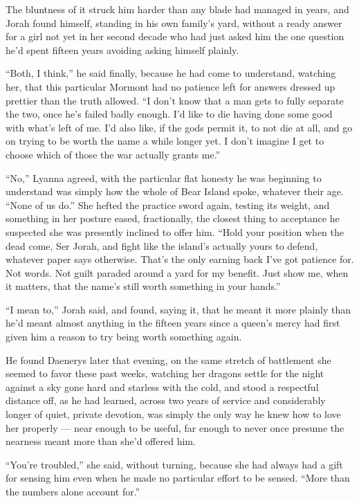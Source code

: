 The bluntness of it struck him harder than any blade had managed in years, and Jorah found himself, standing in his own family’s yard, without a ready answer for a girl not yet in her second decade who had just asked him the one question he’d spent fifteen years avoiding asking himself plainly.

“Both, I think,” he said finally, because he had come to understand, watching her, that this particular Mormont had no patience left for answers dressed up prettier than the truth allowed. “I don’t know that a man gets to fully separate the two, once he’s failed badly enough. I’d like to die having done some good with what’s left of me. I’d also like, if the gods permit it, to not die at all, and go on trying to be worth the name a while longer yet. I don’t imagine I get to choose which of those the war actually grants me.”

“No,” Lyanna agreed, with the particular flat honesty he was beginning to understand was simply how the whole of Bear Island spoke, whatever their age. “None of us do.” She hefted the practice sword again, testing its weight, and something in her posture eased, fractionally, the closest thing to acceptance he suspected she was presently inclined to offer him. “Hold your position when the dead come, Ser Jorah, and fight like the island’s actually yours to defend, whatever paper says otherwise. That’s the only earning back I’ve got patience for. Not words. Not guilt paraded around a yard for my benefit. Just show me, when it matters, that the name’s still worth something in your hands.”

“I mean to,” Jorah said, and found, saying it, that he meant it more plainly than he’d meant almost anything in the fifteen years since a queen’s mercy had first given him a reason to try being worth something again.

\sceneBreak

He found Daenerys later that evening, on the same stretch of battlement she seemed to favor these past weeks, watching her dragons settle for the night against a sky gone hard and starless with the cold, and stood a respectful distance off, as he had learned, across two years of service and considerably longer of quiet, private devotion, was simply the only way he knew how to love her properly — near enough to be useful, far enough to never once presume the nearness meant more than she’d offered him.

“You’re troubled,” she said, without turning, because she had always had a gift for sensing him even when he made no particular effort to be sensed. “More than the numbers alone account for.”

